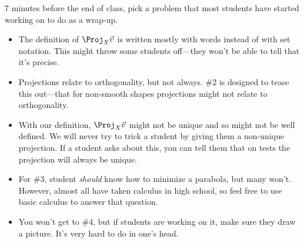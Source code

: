 		7 minutes before the end of class, pick a problem that most students have started working on
		to do as a wrap-up.

	\begin{itemize}
		\item The definition of $\Proj_X\vec v$ is written mostly with words instead of with
			set notation. This might throw some students off---they won't be able to tell that it's precise.
		\item Projections relate to orthogonality, but not always. \#2 is designed to tease this out---that
			for non-smooth shapes projections might not relate to orthogonality.
		\item With our definition, $\Proj_X\vec v$ might not be unique and so might not be well defined. We will
			never try to trick a student by giving them a non-unique projection. If a student asks about
			this, you can tell them that on tests the projection will always be unique.
		\item For \#3, student \emph{should} know how to minimize a parabola, but many won't. However, almost all
			have taken calculus in high school, so feel free to use basic calculus to answer that question.
		\item You won't get to \#4, but if students are working on it, make sure they draw a picture. It's very
			hard to do in one's head.
\end{itemize}